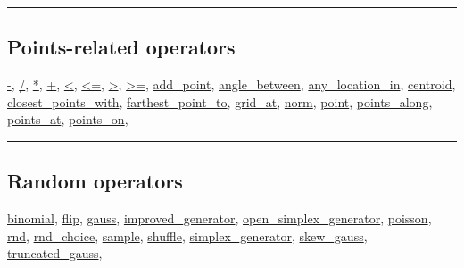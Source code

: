 \documentclass[]{book}
\theoremstyle{definition}
\theoremstyle{definition}
\theoremstyle{definition}
\theoremstyle{remark}
\begin{document}
\begin{center}\rule{0.5\linewidth}{\linethickness}\end{center}

\subsection{Points-related operators}\label{points-related-operators}

\href{operators-a-to-a.html\#-}{-}, \href{operators-a-to-a.html\#/}{/},
\href{operators-a-to-a.html\#*}{*}, \href{operators-a-to-a.html\#+}{+},
\href{operators-a-to-a.html\#\%3C}{\textless{}},
\href{operators-a-to-a.html\#\%3C=}{\textless{}=},
\href{operators-a-to-a.html\#\%3E}{\textgreater{}},
\href{operators-a-to-a.html\#\%3E=}{\textgreater{}=},
\href{operators-a-to-a.html\#add_point}{add\_point},
\href{operators-a-to-a.html\#angle_between}{angle\_between},
\href{operators-a-to-a.html\#any_location_in}{any\_location\_in},
\href{operators-b-to-c.html\#centroid}{centroid},
\href{operators-b-to-c.html\#closest_points_with}{closest\_points\_with},
\href{operators-d-to-h.html\#farthest_point_to}{farthest\_point\_to},
\href{operators-d-to-h.html\#grid_at}{grid\_at},
\href{operators-n-to-r.html\#norm}{norm},
\href{operators-n-to-r.html\#point}{point},
\href{operators-n-to-r.html\#points_along}{points\_along},
\href{operators-n-to-r.html\#points_at}{points\_at},
\href{operators-n-to-r.html\#points_on}{points\_on},

\begin{center}\rule{0.5\linewidth}{\linethickness}\end{center}

\subsection{Random operators}\label{random-operators}

\href{operators-b-to-c.html\#binomial}{binomial},
\href{operators-d-to-h.html\#flip}{flip},
\href{operators-d-to-h.html\#gauss}{gauss},
\href{operators-i-to-m.html\#improved_generator}{improved\_generator},
\href{operators-n-to-r.html\#open_simplex_generator}{open\_simplex\_generator},
\href{operators-n-to-r.html\#poisson}{poisson},
\href{operators-n-to-r.html\#rnd}{rnd},
\href{operators-n-to-r.html\#rnd_choice}{rnd\_choice},
\href{operators-s-to-z.html\#sample}{sample},
\href{operators-s-to-z.html\#shuffle}{shuffle},
\href{operators-s-to-z.html\#simplex_generator}{simplex\_generator},
\href{operators-s-to-z.html\#skew_gauss}{skew\_gauss},
\href{operators-s-to-z.html\#truncated_gauss}{truncated\_gauss},
\end{document}
